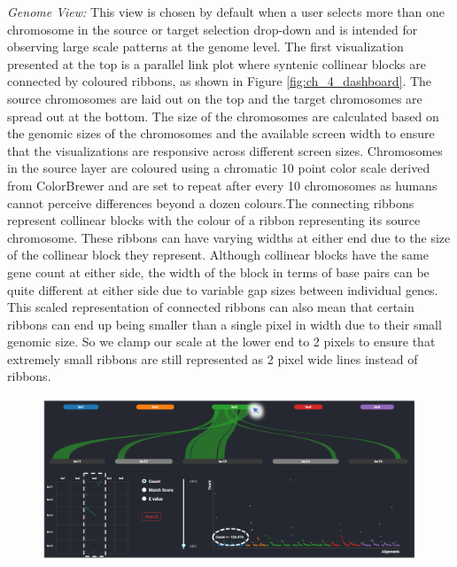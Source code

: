 \textit{Genome View:}
This view is chosen by default when a user selects more than one chromosome in the source or target selection drop-down and is intended for observing large scale patterns at the genome level.
The first visualization presented at the top is a parallel link plot where syntenic collinear blocks are connected by coloured ribbons, as shown in Figure \ref{fig:ch_4_dashboard}. The source chromosomes are laid out on the top and the target chromosomes are spread out at the bottom. The size of the chromosomes are calculated based on the genomic sizes of the chromosomes and the available screen width to ensure that the visualizations are responsive across different screen sizes. Chromosomes in the source layer are coloured using a chromatic 10 point color scale derived from ColorBrewer\cite{colorbrewer} and are set to repeat after every 10 chromosomes as humans cannot perceive differences beyond a dozen colours\cite{ware2012information}.The connecting ribbons represent collinear blocks with the colour of a ribbon representing its source chromosome. These ribbons can have varying widths at either end due to the size of the collinear block they represent. Although collinear blocks have the same gene count at either side, the width of the block in terms of base pairs can be quite different at either side due to variable gap sizes between individual genes. This scaled representation of connected ribbons can also mean that certain ribbons can end up being smaller than a single pixel in width due to their small genomic size. So we clamp our scale at the lower end to 2 pixels to ensure that extremely small ribbons are still represented as 2 pixel wide lines instead of ribbons.


\begin{figure}
  \centering
  \includegraphics[width=.95\linewidth]{images/ch_5_genome_view_2.PNG}
  \label{fig:ch_5_genome_view_2}
\end{figure} 


